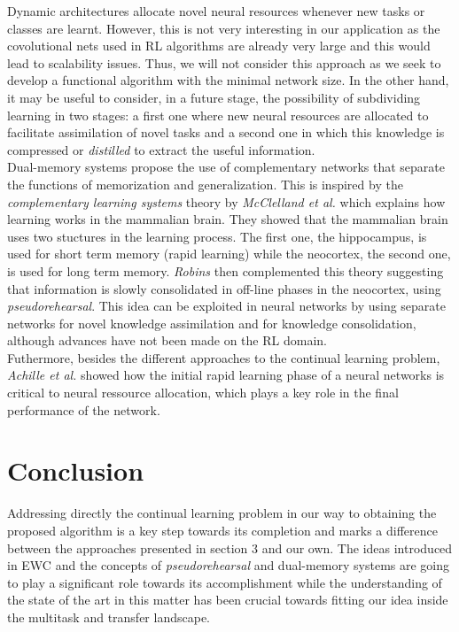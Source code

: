 \documentclass{article}
\begin{document}
\newline
Dynamic architectures allocate novel neural resources whenever  new tasks or classes are learnt. However, this is not very interesting in our application as the covolutional nets used in RL algorithms are already very large and this would lead to scalability issues. Thus, we will not consider this approach as we seek to develop a functional algorithm with the minimal network size. In the other hand, it may be useful to consider, in a future stage, the possibility of subdividing learning in two stages: a first one where new neural resources are allocated to facilitate assimilation of novel tasks and a second one in which this knowledge is compressed or \textit{distilled} to extract the useful information.\\
\newline
Dual-memory systems propose the use of complementary networks that separate the functions of memorization and generalization. This is inspired by the \textit{complementary learning systems} theory by \textit{McClelland et al.}\citep{McClelland1995WhyMemory.} which explains how learning works in the mammalian brain. They showed that the mammalian brain uses two stuctures in the learning process. The first one, the hippocampus, is used for short term memory (rapid learning) while the neocortex, the second one, is used for long term memory. \textit{Robins} then complemented this theory suggesting that information is slowly consolidated in off-line phases in the neocortex, using \textit{pseudorehearsal}. This idea can be exploited in neural networks by using separate networks for novel knowledge assimilation and for knowledge consolidation, although advances have not been made on the RL domain.\\
\newline
Futhermore, besides the different approaches to the continual learning problem, \textit{Achille et al.} \citep{Achille2017CriticalNetworks} showed how the initial rapid learning phase of a neural networks is critical to neural ressource allocation, which plays a key role in the final performance of the network.
\section{Conclusion}

Addressing directly the continual learning problem in our way to obtaining the proposed algorithm is a key step towards its completion and marks a difference between the approaches presented in section 3 and our own. The ideas introduced in EWC \citep{Kirkpatrick2017OvercomingNetworks.} and the concepts of \textit{pseudorehearsal} and dual-memory systems are going to play a significant role towards its accomplishment while the understanding of the state of the art in this matter has been crucial towards fitting our idea inside the multitask and transfer landscape. 




\newpage
\end{document}
